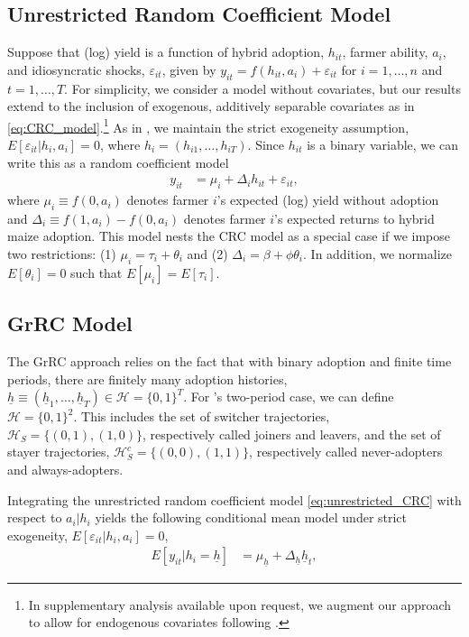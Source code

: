 \documentclass[12pt]{article}
\theoremstyle{plain}
\theoremstyle{definition}
\begin{document}
\subsection{Unrestricted Random Coefficient Model}
Suppose that (log) yield is a function of hybrid adoption, $h_{it}$, farmer ability, $a_{i}$, and idiosyncratic shocks, $\varepsilon_{it}$, given by $y_{it} =f(h_{it},a_{i})+\varepsilon_{it}$ for $i=1,\dots,n$ and $t=1,\dots, T$. 
For simplicity, we consider a model without covariates, but our results extend to the inclusion of exogenous, additively separable covariates as in \eqref{eq:CRC_model}.\footnote{In supplementary analysis available upon request, we augment our approach to allow for endogenous covariates following \citet{S2011}.}
As in \citet{S2011}, we maintain the strict exogeneity assumption, $E[\varepsilon_{it}|h_{i},a_{i}]=0$, where $h_{i}=(h_{i1},\dots,h_{iT})$.   Since $h_{it}$ is a binary variable, we can write this as a random coefficient model
\begin{align}
y_{it}&=\mu_{i}+\Delta_{i}h_{it}+\varepsilon_{it},\label{eq:unrestricted_CRC}
\end{align}
where $\mu_i\equiv f(0,a_{i})$ denotes farmer $i$'s expected (log) yield without adoption and $\Delta_i\equiv f(1,a_{i})-f(0,a_{i})$ denotes farmer $i$'s expected returns to hybrid maize adoption. 
This model nests the \citet{S2011} CRC model as a special case if we impose two restrictions: (1) $\mu_{i}=\tau_{i}+\theta_{i}$ and (2) $\Delta_{i}=\beta+\phi\theta_{i}$. In addition, we normalize $E[\theta_i]=0$ such that $E[\mu_i]=E[\tau_i]$. 

\subsection{GrRC Model}\label{sec:two_period_id}

The GrRC approach relies on the fact that with binary adoption and finite time periods, there are finitely many adoption histories, $\underline{h}\equiv (\underline{h}_1,\dots,\underline{h}_T)\in\mathcal{H}=\{0,1\}^T$. 
For \citet{S2011}'s two-period case, we can define $\mathcal{H}=\{0,1\}^2$. 
This includes the set of switcher trajectories, $\mathcal{H}_{S}=\{(0,1),(1,0)\}$, respectively called joiners and leavers, and the set of stayer trajectories, $\mathcal{H}_{S}^c=\{(0,0),(1,1)\}$, respectively called never-adopters and always-adopters. 


Integrating the unrestricted random coefficient model \eqref{eq:unrestricted_CRC} with respect to $a_{i}|h_{i}$ yields the following conditional mean model under strict exogeneity, $E[\varepsilon_{it}|h_i,a_i]=0$,
\begin{align}
E[y_{it}|h_{i}=\underline{h}]&= \mu_{\underline{h}}+\Delta_{\underline{h}}\underline{h}_{t},
\end{align}
\end{document}
